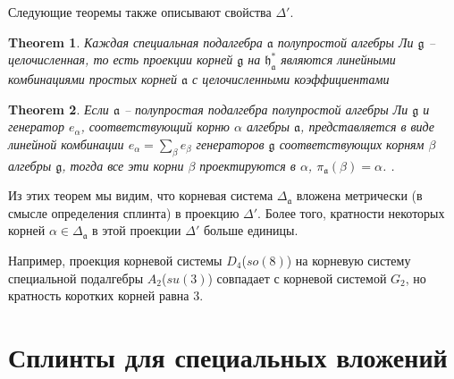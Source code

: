 \documentclass[12pt]{article}
\newtheorem{theorem}{Theorem}
\newcommand{\pia}{\pi_{\mathfrak{a}}}
\newcommand{\gf}{\mathfrak{g}}
\newcommand{\af}{\mathfrak{a}}
\newcommand{\hf}{\mathfrak{h}}
\newcommand{\hfa}{\hf_{\af}}
\begin{document}
Следующие теоремы \cite{dynkin1952semisimple} также описывают свойства  $\Delta'$. 

\begin{theorem}\label{dyn1}
  Каждая специальная подалгебра  $\af$ полупростой алгебры Ли  $\gf$ -- целочисленная, то есть
  проекции корней  $\gf$ на $\hfa^{*}$ являются линейными комбинациями простых корней  $\af$ с
  целочисленными коэффициентами \cite{dynkin1952semisimple}
\end{theorem}

\begin{theorem}\label{dyn2}
  Если $\af$  -- полупростая подалгебра полупростой алгебры Ли $\gf$ и генератор $e_{\alpha}$,
  соответствующий корню $\alpha$ алгебры $\af$, представляется в виде линейной комбинации  $e_{\alpha}=\sum_{\beta}
  e_{\beta}$ генераторов $\gf$ соответствующих корням  $\beta$ алгебры $\gf$, тогда все эти корни
  $\beta$ проектируются в  $\alpha$,
  $\pia(\beta)=\alpha$. 
  \cite{dynkin1972semisimple,dynkin1952semisimple}. 
\end{theorem}

Из этих теорем мы видим, что  корневая система $\Delta_{\af}$ вложена метрически (в смысле
определения сплинта) в проекцию  $\Delta'$. Более того, кратности некоторых корней 
$\alpha\in\Delta_{\af}$ в этой проекции  $\Delta'$ больше единицы. 

Например, проекция корневой системы $D_{4}$($so(8)$) на корневую систему специальной подалгебры
$A_{2}$($su(3)$) совпадает с корневой системой $G_{2}$, но кратность коротких корней равна $3$.



\section{Сплинты для специальных вложений}
\label{sec:splints-spec-embedd}

\end{document}
